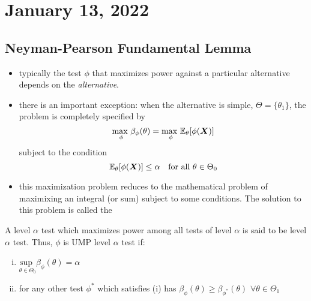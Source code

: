 \section{January 13, 2022}

\subsection{Neyman-Pearson Fundamental Lemma}

\begin{itemize}
    \item typically the test $\phi$ that maximizes power against a particular alternative depends on the \textit{alternative}.
    \item there is an important exception: when the alternative is simple, $\Theta = \{ \theta_1 \}$, the problem is completely specified by
    $$
    \underset{\phi}{\text{max }}\beta_{\phi}(\theta) = \underset{\phi}{\text{max }}\mathbb E_{\theta}[\phi(\boldsymbol{X})]
    $$
    subject to the condition
    $$
    \mathbb E_{\theta}[\phi(\boldsymbol{X})] \leq \alpha  \quad \text{for all } \theta \in \Theta_0
    $$
    \item this maximization problem reduces to the mathematical problem of maximixing an integral (or sum) subject to some conditions. The solution to this problem is called the 
\end{itemize}


\begin{definition}
    A level $\alpha$ test which maximizes power among all tests of level $\alpha$ is said to be   level $\alpha$ test. Thus, $\phi$ is UMP level $\alpha$ test if:
    \begin{enumerate}[(i)]
        \item $\underset{\theta \in \Theta_{0}}{\text{sup }} \beta_{\phi}(\theta) = \alpha$
        \item for any other test $\phi^*$ which satisfies (i) has $\beta_{\phi}(\theta) \geq \beta_{\phi^*}(\theta)$  $\forall \theta \in \Theta_{1} $ 
        
    \end{enumerate}
\end{definition}

